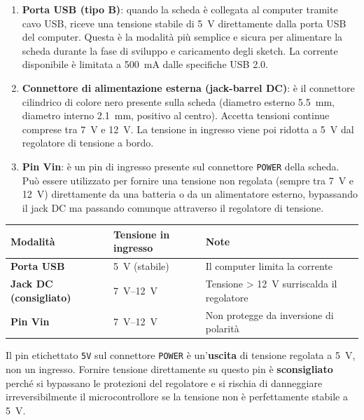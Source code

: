 \begin{enumerate}
    \item \textbf{Porta USB (tipo B)}: quando la scheda è collegata al computer tramite cavo USB, riceve una tensione stabile di \SI{5}{\volt} direttamente dalla porta USB del computer. Questa è la modalità più semplice e sicura per alimentare la scheda durante la fase di sviluppo e caricamento degli sketch. La corrente disponibile è limitata a \SI{500}{\milli\ampere} dalle specifiche USB 2.0.

    \item \textbf{Connettore di alimentazione esterna (jack-barrel DC)}: è il connettore cilindrico di colore nero presente sulla scheda (diametro esterno \SI{5.5}{\milli\meter}, diametro interno \SI{2.1}{\milli\meter}, positivo al centro). Accetta tensioni continue comprese tra \SI{7}{\volt} e \SI{12}{\volt}. La tensione in ingresso viene poi ridotta a \SI{5}{\volt} dal regolatore di tensione a bordo.

    \item \textbf{Pin Vin}: è un pin di ingresso presente sul connettore \texttt{POWER} della scheda. Può essere utilizzato per fornire una tensione non regolata (sempre tra \SI{7}{\volt} e \SI{12}{\volt}) direttamente da una batteria o da un alimentatore esterno, bypassando il jack DC ma passando comunque attraverso il regolatore di tensione.
\end{enumerate}

\begin{center}
\begin{tabular}{>{\bfseries}l l l l}
    \toprule
    Modalità           & Tensione in ingresso  & Note \\
    \midrule
    Porta USB          & \SI{5}{\volt} (stabile) & Il computer limita la corrente \\
    Jack DC (consigliato) & \SIrange{7}{12}{\volt} & Tensione > \SI{12}{\volt} surriscalda il regolatore \\
    Pin Vin            & \SIrange{7}{12}{\volt} & Non protegge da inversione di polarità \\
    \bottomrule
\end{tabular}
\end{center}

\begin{tcolorbox}[colback=red!4, colframe=red!60, title=\textbf{Attenzione – Pin 5V come ingresso}]
    Il pin etichettato \texttt{5V} sul connettore \texttt{POWER} è un'\textbf{uscita} di tensione regolata a \SI{5}{\volt}, non un ingresso. Fornire tensione direttamente su questo pin è \textbf{sconsigliato} perché si bypassano le protezioni del regolatore e si rischia di danneggiare irreversibilmente il microcontrollore se la tensione non è perfettamente stabile a \SI{5}{\volt}.
\end{tcolorbox}

